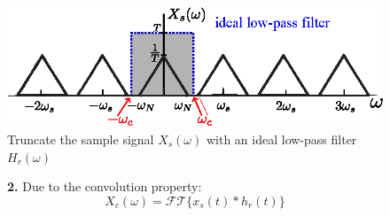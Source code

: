 \begin{figure}[H]
    \centering
    \includegraphics[width = .7\textwidth]{images/apply_low_pass_filter.eps}
    \caption{Truncate the sample signal $X_s(\omega)$ with an ideal low-pass filter $H_r(\omega)$}
    \label{fig:apply_low_pass_filter}
\end{figure}

\begin{figure}[H]
\begin{minipage}{0.65\textwidth}
\textbf{2.} Due to the convolution property:
\[ X_{c}(\omega) = \mathcal{FT} \{  x_{s}(t) * h_{r}(t) \} \]


\end{minipage}
\end{figure}
